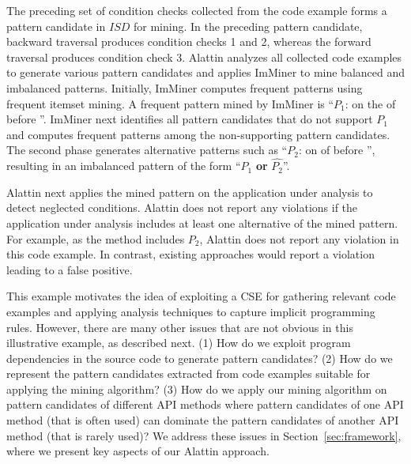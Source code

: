 The preceding set of condition checks collected from the code example forms a pattern candidate
in $ISD$ for mining. In the preceding pattern candidate, backward traversal
produces condition checks 1 and 2, whereas the forward traversal produces 
condition check 3. Alattin analyzes all collected
code examples to generate various pattern candidates and applies ImMiner
to mine balanced and imbalanced patterns. Initially, ImMiner
computes frequent patterns using frequent itemset mining.
A frequent pattern mined by ImMiner is ``$P_1$:  on the 
of  before ''.
ImMiner next identifies all pattern candidates that do not support 
$P_1$ and computes frequent patterns among the non-supporting pattern candidates. 
The second phase generates alternative patterns such as
``$P_2$:  on 
of  before '',
resulting in an imbalanced pattern of the form ``$P_1$ \textbf{or} $\hat{P_2}$''.

Alattin next applies the mined pattern on the application under analysis 
to detect neglected conditions. Alattin does not report any 
violations if the application under analysis includes at least
one alternative of the mined pattern. For example, as the 
 method includes $P_2$, Alattin does not report
any violation in this code example. In contrast, existing 
approaches would report a violation leading to a false positive.

This example motivates the idea of 
exploiting a CSE for gathering relevant code examples
and applying analysis techniques to capture implicit programming rules. 
However, there are many other issues that are not obvious
in this illustrative example, as described next. 
(1) How do we exploit program dependencies in the source code to generate pattern candidates?
(2) How do we represent the pattern candidates extracted from code examples suitable for
applying the mining algorithm?
(3) How do we apply our mining algorithm on pattern candidates of different API
methods where pattern candidates of one API method (that is often used) can dominate the
pattern candidates of another API method (that is rarely used)? 
We address these issues in Section~\ref{sec:framework}, where we present key aspects
of our Alattin approach.
